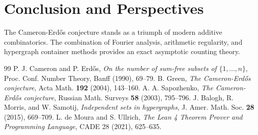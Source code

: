 \documentclass[11pt,a4paper]{article}
\theoremstyle{definition}
\begin{document}
\section{Conclusion and Perspectives}
The Cameron-Erd\H{o}s conjecture stands as a triumph of modern additive combinatorics. The combination of Fourier analysis, arithmetic regularity, and hypergraph container methods provides an exact asymptotic counting theory.

\begin{thebibliography}{99}
 P. J. Cameron and P. Erd\H{o}s, \textit{On the number of sum-free subsets of $\{1, \dots, n\}$}, Proc. Conf. Number Theory, Banff (1990), 69--79.
 B. Green, \textit{The Cameron-Erd\H{o}s conjecture}, Acta Math. \textbf{192} (2004), 143--160.
 A. A. Sapozhenko, \textit{The Cameron-Erd\H{o}s conjecture}, Russian Math. Surveys \textbf{58} (2003), 795--796.
 J. Balogh, R. Morris, and W. Samotij, \textit{Independent sets in hypergraphs}, J. Amer. Math. Soc. \textbf{28} (2015), 669--709.
 L. de Moura and S. Ullrich, \textit{The Lean 4 Theorem Prover and Programming Language}, CADE 28 (2021), 625--635.
\end{thebibliography}
\end{document}
